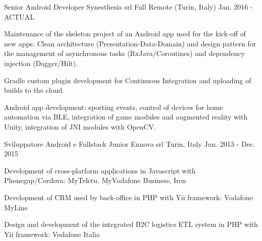 


\begin{cventries}


\cventry
{Senior Android Developer} %
{Synesthesia srl} %
{Full Remote (Turin, Italy)} %
{Jan. 2016 - ACTUAL} %
{ %
	\begin{cvitems}
		\item {Maintenance of the skeleton project of an Android app used for the kick-off of new apps: Clean architecture (Presentation-Data-Domain) and design pattern for the management of asynchronous tasks (RxJava/Coroutines) and dependency injection (Dagger/Hilt).}
		\item {Gradle custom plugin development for Continuous Integration and uploading of builds to the cloud.}
		\item {Android app development: sporting events, control of devices for home automation via BLE, integration of game modules and augmented reality with Unity, integration of JNI modules with OpenCV.}
	\end{cvitems}
}


\cventry
{Sviluppatore Android e Fullstack Junior} %
{Ennova srl} %
{Turin, Italy} %
{Jun. 2013 - Dec. 2015} %
{ %
	\begin{cvitems}
		\item {Development of cross-platform applications in Javascript with Phonegap/Cordova: MyTeletu, MyVodafone Business, Iren}
		\item {Development of CRM used by back-office in PHP with Yii framework: Vodafone MyLine}
		\item {Design and development of the integrated B2C logistics ETL system in PHP with Yii framework: Vodafone Italia}
	\end{cvitems}
}

\end{cventries}